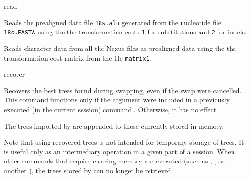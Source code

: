 \begin{command}{read}{}
\begin{poyexamples}
	    {Reads the prealigned data file \texttt{18s.aln} generated from the nucleotide file \texttt{18s.FASTA}
	    using the the transformation costs \texttt{1} for substitutions and \texttt{2} for indels.}
	
	    {Reads character data from all the Nexus files as prealigned data using the the transformation cost
	    matrix from the file \texttt{matrix1}.}

	\end{poyexamples}

	\begin{poyalso}
	\end{poyalso}

\end{command}

   
\begin{command}{recover}{}
    \syntax{\obligatory{()}}

    \begin{poydescription}
            Recovers the best trees found during swapping, even if the swap were
            cancelled. This command functions only if the argument  
            were included in a previously executed 
            (in the current \poy session) command . Otherwise, it has no effect.
	
	The trees imported by  are appended to those currently
	stored in memory.
	
	Note that using recovered trees is not intended for temporary storage of trees.
	It is useful only as an intermediary operation in a given part of a \poy session. When
	other commands that require clearing memory are executed (such as
	, , or another
	),
	the trees stored by  can no longer be retrieved.
            
    \end{poydescription}

    \begin{poyexamples}
    \end{poyexamples}

    \begin{poyalso}
    \end{poyalso}
\end{command}

